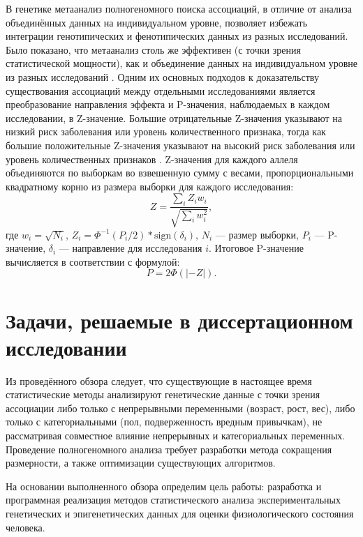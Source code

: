 В генетике метаанализ полногеномного поиска ассоциаций, в отличие от анализа объединённых данных на индивидуальном уровне, позволяет избежать интеграции генотипических и фенотипических данных из разных исследований. Было показано, что метаанализ столь же эффективен (с точки зрения статистической мощности), как и объединение данных на индивидуальном уровне из разных исследований \autocite{Lin2009}. Одним их основных подходов к доказательству существования ассоциаций между отдельными исследованиями является преобразование направления эффекта и P-значения, наблюдаемых в каждом исследовании, в Z-значение. Большие отрицательные Z-значения указывают на низкий риск заболевания или уровень количественного признака, тогда как большие положительные Z-значения указывают на высокий риск заболевания или уровень количественных признаков \autocite{Willer2010}. Z-значения для каждого аллеля объединяются по выборкам во взвешенную сумму с весами, пропорциональными квадратному корню из размера выборки для каждого исследования:
\begin{equation}
\label{eq:metal_z}
Z=\frac{\sum_{i}Z_i w_i}{\sqrt{\sum_{i}w_i^2}},
\end{equation}
где $w_i = \sqrt{N_i}$, $Z_i = \Phi^{-1}\left(P_i/2\right) * \text{sign}(\delta_i)$, $N_i$ --- размер выборки, $P_i$ --- P-значение, $\delta_i$ --- направление для исследования $i$. Итоговое P-значение вычисляется в соответствии с формулой:
\begin{equation}
\label{eq:metal_p}
P = 2\Phi \left(|-Z|\right).
\end{equation}

\section{Задачи, решаемые в диссертационном исследовании}\label{sec:ch1/sec3}

Из проведённого обзора следует, что существующие в настоящее время статистические методы анализируют генетические данные с точки зрения ассоциации либо только с непрерывными переменными (возраст, рост, вес), либо только с категориальными (пол, подверженность вредным привычкам), не рассматривая совместное влияние непрерывных и категориальных переменных. Проведение полногеномного анализа требует разработки метода сокращения размерности, а также оптимизации существующих алгоритмов.

На основании выполненного обзора определим цель работы: разработка и программная реализация методов статистического анализа экспериментальных генетических и эпигенетических данных для оценки физиологического состояния человека.

